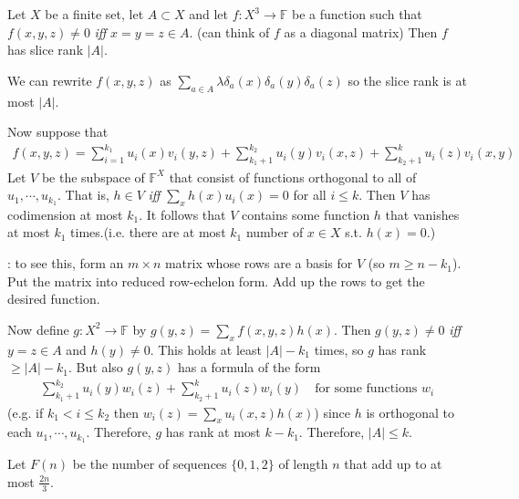 \documentclass[12pt,a4paper]{report}
\newenvironment{proof}
{\begin{changemargin}{1cm}{0.5cm}
	}%
	{\end{changemargin}
}
\newenvironment{subproof}
{\begin{changemargin}{0.5cm}{0.5cm}
	}%
	{\end{changemargin}
}
\begin{document}
 Let $X$ be a finite set, let $A\subset X$ and let $f: X^3 \rightarrow \mathbb{F}$ be a function such that $f(x,y,z) \neq 0$ \emph{iff} $x=y=z\in A$. (can think of $f$ as a diagonal matrix) Then $f$ has slice rank $|A|$. 
\begin{proof}
\pf We can rewrite $f(x,y,z)$ as $\sum_{a\in A} \lambda \delta_a (x) \delta_a(y) \delta_a(z)$ so the slice rank is at most $|A|$. 

\quad Now suppose that 
\begin{align*}
f(x,y,z) = \sum_{i=1}^{k_1} u_i(x) v_i(y,z) + \sum_{k_1 +1}^{k_2} u_i(y)v_i(x,z) + \sum_{k_2+1}^k u_i(z)v_i(x,y)
\end{align*}
Let $V$ be the subspace of $\mathbb{F}^{X}$ that consist of functions orthogonal to all of $u_1, \cdots, u_{k_1}$. That is, $h\in V$ \emph{iff} $\sum_{x}h(x)u_i(x) =0$ for all $i\leq k$. Then $V$ has codimension at most $k_1$. It follows that $V$ contains some function $h$ that vanishes at most $k_1$ times.(i.e. there are at most $k_1$ number of $x\in X$ s.t. $h(x) =0$.)
\begin{subproof}
: to see this, form an $m\times n$ matrix whose rows are a basis for $V$ (so $m\geq n-k_1$). Put the matrix into reduced row-echelon form. Add up the rows to get the desired function.
\end{subproof}
Now define $g : X^2 \rightarrow \mathbb{F}$ by $g(y,z) = \sum_x f(x,y,z) h(x)$. Then $g(y,z) \neq 0$ \emph{iff} $y = z \in A$ and $h(y)\neq 0$. This holds at least $|A|-k_1$ times, so $g$ has rank $\geq |A|-k_1$. But also $g(y,z)$ has a formula of the form
\begin{align*}
\sum_{k_1 + 1}^{k_2} u_i(y) w_i(z) + \sum_{k_2 +1}^k u_i(z)w_i(y) \quad \text{for some functions } w_i
\end{align*}
(e.g. if $k_1 < i \leq k_2$ then $w_i(z) = \sum_{x}u_i(x,z)h(x)$) since $h$ is orthogonal to each $u_1, \cdots, u_{k_1}$. Therefore, $g$ has rank at most $k-k_1$. Therefore, $|A| \leq k$.

\eop
\end{proof}
\s

Let $F(n)$ be the number of sequences $\{0,1,2\}$ of length $n$ that add up to at most $\frac{2n}{3}$.
\s
\end{document}
